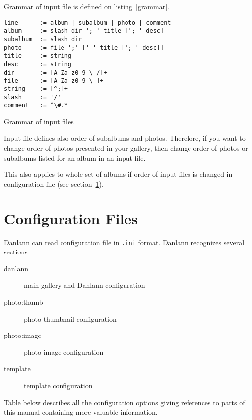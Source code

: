 \documentclass{article}
\begin{document}
Grammar of input file is defined on listing~\ref{grammar}.

\begin{listing}
\begin{lstlisting}
line      := album | subalbum | photo | comment
album     := slash dir '; ' title ['; ' desc]
subalbum  := slash dir
photo     := file ';' [' ' title ['; ' desc]]
title     := string
desc      := string
dir       := [A-Za-z0-9_\-/]+
file      := [A-Za-z0-9_\-]+
string    := [^;]+
slash     := '/'
comment   := ^\#.*
\end{lstlisting}
\caption{Grammar of input files}\label{grammar}
\end{listing}

Input file defines also order of subalbums and photos. 
Therefore, if you want to change order of photos presented in your gallery, then
change order of photos or subalbums listed for an album in an input file.

This also applies to whole set of albums if order of input files is changed
in configuration file (see section~\ref{conf:all}).

\section{Configuration Files}\label{conf:all}
Danlann can read configuration file in \texttt{.ini} format. Danlann
recognizes several sections
\begin{description}
\item[danlann] main gallery and Danlann configuration
\item[photo:thumb] photo thumbnail configuration
\item[photo:image] photo image configuration
\item[template] template configuration
\end{description}

Table below describes all the configuration options giving references to
parts of this manual containing more valuable information.
\end{document}

